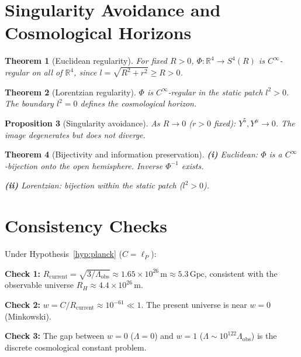 \documentclass[12pt,a4paper]{article}
\newtheorem{theorem}{Theorem}[section]
\newtheorem{proposition}[theorem]{Proposition}
\begin{document}
\section{Singularity Avoidance and Cosmological Horizons}

\begin{theorem}[Euclidean regularity]
For fixed $R > 0$, $\Phi: \mathbb{R}^4 \to S^4(R)$ is $C^\infty$-regular on all of $\mathbb{R}^4$, since $l = \sqrt{R^2 + r^2} \geq R > 0$.
\end{theorem}

\begin{theorem}[Lorentzian regularity]
$\Phi$ is $C^\infty$-regular in the static patch $l^2 > 0$. The boundary $l^2 = 0$ defines the cosmological horizon.
\end{theorem}

\begin{proposition}[Singularity avoidance]
As $R \to 0$ ($r > 0$ fixed): $Y^5, Y^\mu \to 0$. The image degenerates but does not diverge.
\end{proposition}

\begin{theorem}[Bijectivity and information preservation]\label{thm:bij}
\textbf{(i)} Euclidean: $\Phi$ is a $C^\infty$-bijection onto the open hemisphere. Inverse $\Phi^{-1}$ exists.

\textbf{(ii)} Lorentzian: bijection within the static patch ($l^2 > 0$).
\end{theorem}

\section{Consistency Checks}

Under Hypothesis~\ref{hyp:planck} ($C = \ell_P$):

\textbf{Check 1:} $R_{\text{current}} = \sqrt{3/\Lambda_{\text{obs}}} \approx 1.65 \times 10^{26}\,\text{m} \approx 5.3\,\text{Gpc}$, consistent with the observable universe $R_H \approx 4.4 \times 10^{26}\,\text{m}$.

\textbf{Check 2:} $w = C/R_{\text{current}} \approx 10^{-61} \ll 1$. The present universe is near $w = 0$ (Minkowski).

\textbf{Check 3:} The gap between $w = 0$ ($\Lambda = 0$) and $w = 1$ ($\Lambda \sim 10^{122}\Lambda_{\text{obs}}$) is the discrete cosmological constant problem.
\end{document}
